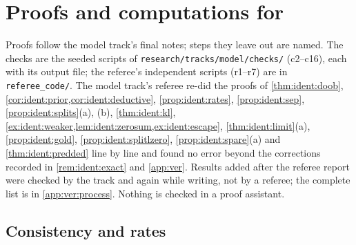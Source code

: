 
\providecommand{\crefabbrev}{}%
\section{Proofs and computations for \texorpdfstring{}{Section 4}}\label{app:ident}

Proofs follow the model track's final notes; steps they leave out are named. The checks are the seeded scripts of \texttt{research/tracks/model/checks/} (c2--c16), each with its output file; the referee's independent scripts (r1--r7) are in \texttt{referee\_code/}. The model track's referee re-did the proofs of \cref{thm:ident:doob}, \cref{cor:ident:prior,cor:ident:deductive}, \cref{prop:ident:rates}, \cref{prop:ident:sep}, \cref{prop:ident:splits}(a), (b), \cref{thm:ident:kl}, \cref{ex:ident:weaker,lem:ident:zerosum,ex:ident:escape}, \cref{thm:ident:limit}(a), \cref{prop:ident:gold}, \cref{prop:ident:splitlzero}, \cref{prop:ident:spare}(a) and \cref{thm:ident:predded} line by line and found no error beyond the corrections recorded in \cref{rem:ident:exact} and \cref{app:ver}. Results added after the referee report were checked by the track and again while writing, not by a referee; the complete list is in \cref{app:ver:process}. Nothing is checked in a proof assistant.

\subsection{Consistency and rates}\label{app:ident:doob}

